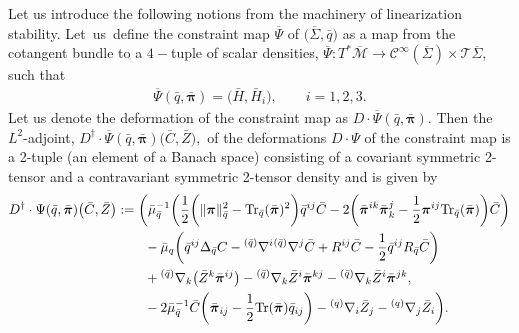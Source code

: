 \documentclass[11pt]{article}
\numberwithin{equation}{section}
\def\mbo#1{\boldsymbol{#1}}%
\def\olin#1{\overline{#1}{}}%
\def\grad{{\nabla}}%
\newcommand{\leftexp}[2]{{\vphantom{#2}}^{#1}{#2}}
\def\halb{\frac{1}{2}}%
\numberwithin{equation}{section}
\begin{document}
Let us introduce the following notions from the machinery of linearization stability.
Let~us~define the constraint map $\olin{\Psi}$ of $\bigl(\overline{\Sigma}, \bar{q}\bigr)$ as a map from the cotangent bundle to a $4-$tuple of scalar densities, $ \olin{\Psi} \colon T^* \olin{\mathcal{M}} \to \mathcal{C}^{\infty} (\olin{\Sigma}) \times \mathcal{T} \olin{\Sigma}$, such that
\begin{align*}
\olin{\Psi} (\bar{q}, \bar{\mbo{\pi}}) = \bigl(\bar{H}, \bar{H}_i\bigr), \qquad i = 1, 2, 3.
\end{align*}
Let us denote the deformation of the constraint map as $D \cdot \olin{\Psi} (\bar{q}, \bar{\mbo{\pi}})$.
Then the $L^2$-adjoint,
$D^\dagger \cdot \olin{\Psi} (\bar{q}, \bar{\mbo{\pi}}) \bigl(\bar{C}, \bar{Z}\bigr), $ of the deformations $D \cdot \Psi$ of the constraint map is a
2-tuple (an element of a Banach space) consisting of a covariant symmetric 2-tensor and a contravariant symmetric 2-tensor density and is given by
\begin{align}
D^\dagger \cdot \Psi (\bar{q}, \bar{\mbo{\pi}}) \bigl(\bar{C}, \bar{Z}\bigr) &:= \biggl(\bar{\mu}^{-1}_{\bar{q}} \biggl( \halb \biggl(\Vert \mbo{\pi} \Vert_{\bar{q}}^2 - {\rm Tr}_{\bar{q}}(\bar{\mbo{\pi}})^2 \biggr) \bar{q}^{ij} \bar{C} - 2 \biggl(\bar{\mbo{\pi}}^{ik} \bar{\mbo{\pi}}_k^{j} - \halb \mbo{\pi}^{ij} {\rm Tr}_{\bar{q}} (\bar{\mbo{\pi}}) \biggr) \bar{C} \biggr) \notag\\
&\hphantom{:= \biggl(}{} -\bar{\mu}_q \biggl(\bar{q}^{ij} \Delta_{\bar{q}} C - \leftexp{(\bar{q})}{\grad}^{i} \leftexp{(\bar{q})}{\grad}^{j} \bar{C} + R^{ij} \bar{C} - \halb \bar{q}^{ij} R_{\bar{q}} \bar{C} \biggr) \notag\\
&\hphantom{:= \biggl(}{} + \leftexp{(\bar{q})}{\grad}_k \bigl(\bar{Z}^k \bar{\mbo{\pi}}^{ij}\bigr) - \leftexp{(\bar{q})}{\grad}_k \bar{Z}^i \bar{\mbo{\pi}}^{kj} - \leftexp{(\bar{q})}{\grad}_k \bar{Z}^i \bar{\mbo{\pi}}^{jk}, \notag\\
&\hphantom{:= \biggl(}{} -2 \bar{\mu}_{\bar{q}}^{-1} \bar{C} \biggl(\bar{\mbo{\pi}}_{ij} - \halb {\rm Tr} (\bar{\mbo{\pi}}) \bar{q}_{ij} \biggr) - \leftexp{(q)}{\grad}_i \bar{Z}_j - \leftexp{(q)}{\grad}_j \bar{Z}_i \biggr).\label{3+1adjoint}
\end{align}
\iffalse
\end{document}

